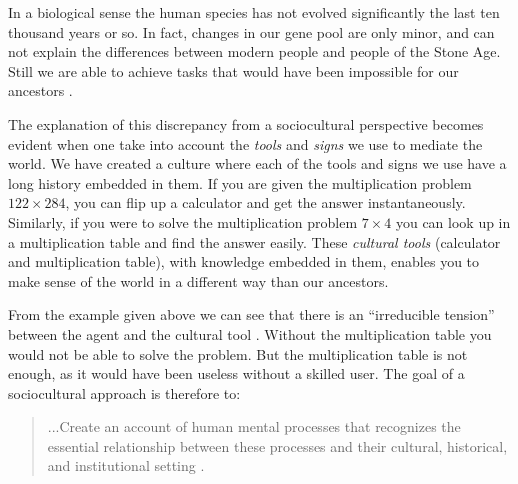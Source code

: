 

In a biological sense the human species has not evolved significantly the last ten thousand years or so. In fact, changes in our gene pool are only minor, and can not explain the differences between modern people and people of the Stone Age. Still we are able to achieve tasks that would have been impossible for our ancestors \citep{saljo2001laering}.

The explanation of this discrepancy from a sociocultural perspective becomes evident when one take into account the \emph{tools} and \emph{signs} we use to mediate the world. We have created a culture where each of the tools and signs we use have a long history embedded in them. If you are given the multiplication problem \ensuremath{122\times284}, you can flip up a calculator and get the answer instantaneously. Similarly, if you were to solve the multiplication problem \ensuremath{7\times4} you can look up in a multiplication table and find the answer easily. These \emph{cultural tools} (calculator and multiplication table), with knowledge embedded in them, enables you to make sense of the world in a different way than our ancestors. 

From the example given above we can see that there is an “irreducible tension” between the agent and the cultural tool \citep{wertsch1998mind}. Without the multiplication table you would not be able to solve the problem. But the multiplication table is not enough, as it would have been useless without a skilled user. The goal of a sociocultural approach is therefore to: 

\begin{quote}
...Create an account of human mental processes that recognizes the essential relationship between these processes and their cultural, historical, and institutional setting \citep[p. 6]{wertsch1991voices}. 
\end{quote}

